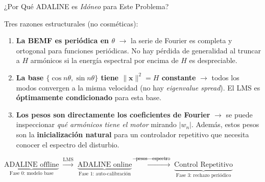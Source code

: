 \begin{frame}{¿Por Qué ADALINE es \textit{Idóneo} para Este Problema?}
    
    Tres razones estructurales (no cosméticas):
    
    \vspace{0.3cm}
    
    \begin{enumerate}
        \item \textbf{La BEMF es periódica en $\theta$} $\rightarrow$ la serie de Fourier es completa y ortogonal para funciones periódicas. No hay pérdida de generalidad al truncar a $H$ armónicos si la energía espectral por encima de $H$ es despreciable.
        
        \vspace{0.2cm}
        
        \item \textbf{La base $\{\cos n\theta, \sin n\theta\}$ tiene $\|\mathbf{x}\|^2 = H$ constante} $\rightarrow$ todos los modos convergen a la misma velocidad (no hay \textit{eigenvalue spread}). El LMS es \textbf{óptimamente condicionado} para esta base.
        
        \vspace{0.2cm}
        
        \item \textbf{Los pesos son directamente los coeficientes de Fourier} $\rightarrow$ se puede inspeccionar \textit{qué armónicos tiene el motor} mirando $|w_n|$. Además, estos pesos son la \textbf{inicialización natural} para un controlador repetitivo que necesita conocer el espectro del disturbio.
    \end{enumerate}
    
    \vspace{0.3cm}
    
    \begin{center}
        \small
        $\underbrace{\text{ADALINE offline}}_{\text{Fase 0: modelo base}}
        \;\xrightarrow{\text{LMS}}\;
        \underbrace{\text{ADALINE online}}_{\text{Fase 1: auto-calibración}}
        \;\xrightarrow{\text{pesos} \rightarrow \text{espectro}}\;
        \underbrace{\text{Control Repetitivo}}_{\text{Fase 3: rechazo periódico}}$
    \end{center}
\end{frame}